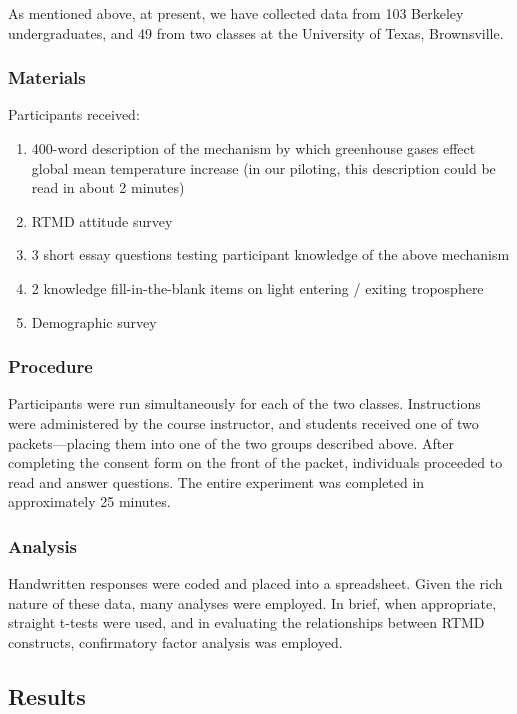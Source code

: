 As mentioned above, at present, we have collected data from 103 Berkeley
undergraduates, and 49 from two classes at the University of Texas,
Brownsville.

\subsubsection{Materials}

Participants received:

\begin{enumerate}
    \item 400-word description of the mechanism 
        by which greenhouse gases effect global mean temperature increase (in our
        piloting, this description could be read in about 2 minutes)
    \item RTMD attitude survey
    \item 3 short essay questions testing participant knowledge of the above mechanism
    \item 2 knowledge fill-in-the-blank items on light entering / exiting troposphere
    \item Demographic survey
\end{enumerate}

\subsubsection{Procedure}

Participants were run simultaneously for each of the two classes. Instructions
were administered by the course instructor, and students received one of two
packets---placing them into one of the two groups described above. After
completing the consent form on the front of the packet, individuals proceeded to
read and answer questions. The entire experiment was completed in approximately
25 minutes.

\subsubsection{Analysis}

Handwritten responses were coded and placed into a spreadsheet. Given the rich
nature of these data, many analyses were employed. In brief, when appropriate,
straight t-tests were used, and in evaluating the relationships between RTMD
constructs, confirmatory factor analysis was employed.

\subsection{Results}


